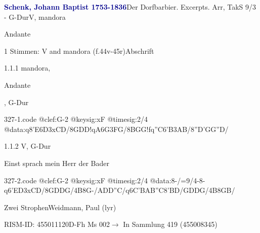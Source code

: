 \documentclass[twocolumn]{book}
\begin{document}
\par \vspace{7pt} \textcolor{darkblue}{\textbf{Schenk, Johann Baptist  1753-1836}}\hfillplus{\textbf{[327]}}\newline Der Dorfbarbier. Excerpts. Arr, TakS 9/3 - G-Dur\newline V, mandora
\par \begin{itshape}[at left, f.44v:] Andante\end{itshape} 
\par \textcolor{darkblue}{}  1 Stimmen: V and mandora  (f.44v-45r)\newline Abschrift
\par 1.1.1  mandora, \begin{itshape}Andante\end{itshape}, G-Dur  
\begin{filecontents*}{327-1.code}
@clef:G-2
@keysig:xF
@timesig:2/4
@data:q8'E{6D3xCD}/{8GDD}!qA{6G3FG}/{8BGG}!fq''C{6'B3AB}/{8''D'GG''D}/
\end{filecontents*}
\newline
%
\par 1.1.2  V, G-Dur\newline \begin{footnotesize} Einst sprach mein Herr der Bader \end{footnotesize}  
\begin{filecontents*}{327-2.code}
@clef:G-2
@keysig:xF
@timesig:2/4
@data:8-/=9/4-8-q6'E{D3xCD}/{8GDDG}/4B8G-/{ADD''C}/q6C{'BAB''C}{8'BD}/{GDDG}/4B{8GB}/
\end{filecontents*}
\newline
%
\par Zwei Strophen\newline Weidmann, Paul  (lyr)
\par RISM-ID: 455011120\newline D-Fh  Ms 002\newline $\rightarrow$ In Sammlung 419 (455008345)
      
\end{document}
